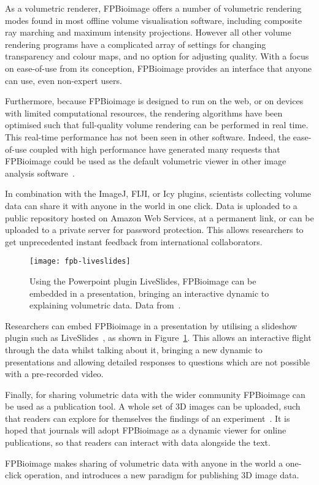 As a volumetric renderer, FPBioimage offers a number of volumetric rendering modes found in most offline volume visualisation software, including composite ray marching and maximum intensity projections.
However all other volume rendering programs have a complicated array of settings for changing transparency and colour maps, and no option for adjusting quality.
With a focus on ease-of-use from its conception, FPBioimage provides an interface that anyone can use, even non-expert users.

Furthermore, because FPBioimage is designed to run on the web, or on devices with limited computational resources, the rendering algorithms have been optimised such that full-quality volume rendering can be performed in real time.
This real-time performance has not been seen in other software.
Indeed, the ease-of-use coupled with high performance have generated many requests that FPBioimage could be used as the default volumetric viewer in other image analysis software~\cite{twitter2018fantm}.

In combination with the ImageJ, FIJI, or Icy plugins, scientists collecting volume data can share it with anyone in the world in one click.
Data is uploaded to a public repository hosted on Amazon Web Services, at a permanent link, or can be uploaded to a private server for password protection.
This allows researchers to get unprecedented instant feedback from international collaborators.

\begin{figure}[htbp!]
\centering
\texttt{[image: fpb-liveslides]}
\caption[FPBioimage: LiveSlides in Powerpoint brings interactive FPBioimage rendering to presentations]{Using the Powerpoint plugin LiveSlides, FPBioimage can be embedded in a presentation, bringing an interactive dynamic to explaining volumetric data. Data from~\cite{kumar2014dual}. } %
\label{fig:fpb-liveslides}
\end{figure}

Researchers can embed FPBioimage in a presentation by utilising a slideshow plugin such as LiveSlides~\cite{liveslides}, as shown in Figure~\ref{fig:fpb-liveslides}.
This allows an interactive flight through the data whilst talking about it, bringing a new dynamic to presentations and allowing detailed responses to questions which are not possible with a pre-recorded video.

Finally, for sharing volumetric data with the wider community FPBioimage can be used as a publication tool.
A whole set of 3D images can be uploaded, such that readers can explore for themselves the findings of an experiment~\cite{teplensky2017temperature}.
It is hoped that journals will adopt FPBioimage as a dynamic viewer for online publications, so that readers can interact with data alongside the text.

FPBioimage makes sharing of volumetric data with anyone in the world a one-click operation, and introduces a new paradigm for publishing 3D image data.
